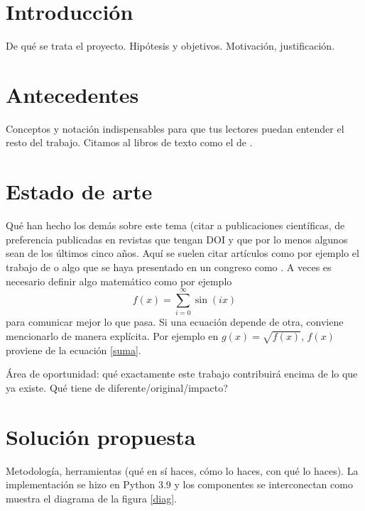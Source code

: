 \documentclass{sciposter}
\begin{document}
\begin{multicols}{2} 

\section{Introducción}

De qué se trata el proyecto. Hipótesis y objetivos. Motivación, justificación.

\section{Antecedentes}

Conceptos y notación indispensables para que tus lectores puedan entender el resto del trabajo. Citamos al libros de texto como el de \citet{ai}.

\section{Estado de arte}

Qué han hecho los demás sobre este tema (citar a publicaciones científicas, de preferencia publicadas en revistas que tengan DOI y que por lo menos algunos sean de los últimos cinco años. Aquí se suelen citar artículos como por ejemplo el trabajo de \citet{elisa} o algo que se haya presentado en un congreso como \citet{ar}. A veces es necesario definir algo matemático como por ejemplo
\begin{equation}
    f(x) = \sum_{i = 0}^\infty \sin(i x)
    \label{suma}
\end{equation}
para comunicar mejor lo que pasa. Si una ecuación depende de otra, conviene mencionarlo de manera explícita.
Por ejemplo en $g(x) = \sqrt{f(x)}$, $f(x)$ proviene de la ecuación \eqref{suma}.

Área de oportunidad: qué exactamente este trabajo contribuirá encima de lo que ya existe.  {\textquestiondown}Qué tiene de diferente/original/impacto?

\section{Solución propuesta}

Metodología, herramientas (qué en sí haces, cómo lo haces, con qué lo haces).
La implementación se hizo en Python 3.9 \citep{python} y los componentes se interconectan como muestra el diagrama de la figura \ref{diag}.


\end{multicols}
\end{document}
